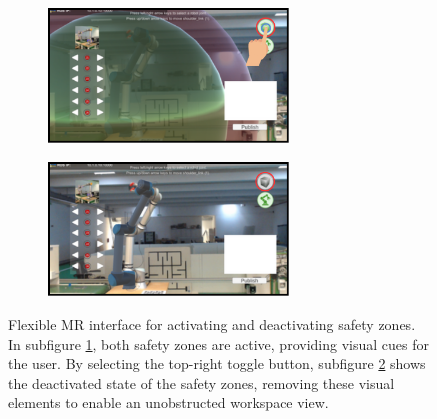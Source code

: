 \begin{figure}[h]
    \centering
    \begin{subfigure}{\textwidth}
        \caption{}
        \centering
        \includegraphics[width=0.7\textwidth]{figs/feature-1.png}
    \label{fig:subfig1}
    \end{subfigure}

    \vspace{0.5em} %

    \begin{subfigure}{\textwidth}
        \caption{}
        \centering
        \includegraphics[width=0.7\textwidth]{figs/feature-2.png}
        \label{fig:subfig2}
    \end{subfigure}
    \caption{Flexible \ac{MR} interface for activating and deactivating safety zones. In subfigure \ref{fig:subfig1}, both safety zones are active, providing visual cues for the user. By selecting the top-right toggle button, subfigure \ref{fig:subfig2} shows the deactivated state of the safety zones, removing these visual elements to enable an unobstructed workspace view.}
    \label{fig:safety-zones-button}
\end{figure}

